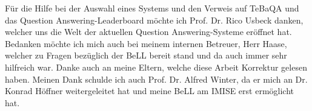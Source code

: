 Für die Hilfe bei der Auswahl eines Systems und den Verweis auf TeBaQA und das Question Answering-Leaderboard möchte ich Prof. Dr. Rico Usbeck danken, welcher uns die Welt der aktuellen Question Answering-Systeme eröffnet hat.
Bedanken möchte ich mich auch bei meinem internen Betreuer, Herr Haase, welcher zu Fragen bezüglich der BeLL bereit stand und da auch immer sehr hilfreich war.
Danke auch an meine Eltern, welche diese Arbeit Korrektur gelesen haben.
Meinen Dank schulde ich auch Prof. Dr. Alfred Winter, da er mich an Dr. Konrad Höffner weitergeleitet hat und meine BeLL am IMISE erst ermöglicht hat.

\endgroup
